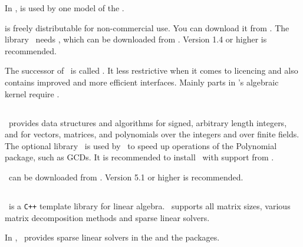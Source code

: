 In \cgal, \rs{} is used by one model of the .

\rs{} is freely distributable for non-commercial use. You can download it
from \rspage{}. The library \rs\ needs \mpfi, which can be downloaded from \mpfipage. 
Version 1.4 or higher is recommended.

The successor of \rs\ is called . It less restrictive when it comes
to licencing and also contains improved and more efficient interfaces.
Mainly parts in \cgal's algebraic kernel require .

\subsection{\ntl \label{thirdparty:NTL}}

\ntl\ provides data structures and algorithms for signed, arbitrary
length integers, and for vectors, matrices, and polynomials over the 
integers and over finite fields. The optional library \ntl\ is used by
\cgal\ to speed up operations of the Polynomial package, such as GCDs.
It is recommended to install \ntl\ with support from \gmp.

\ntl\ can be downloaded from \ntlpage. Version 5.1 or higher is recommended.


%
%

\subsection{\eigen \label{thirdparty:Eigen}}
\eigen\ is a \texttt{C++} template library for linear algebra. \eigen\ supports all
 matrix sizes, various matrix decomposition methods and sparse linear solvers.
 
 In \cgal, \eigen\ provides sparse linear solvers in the 
 and the  packages. 
  

